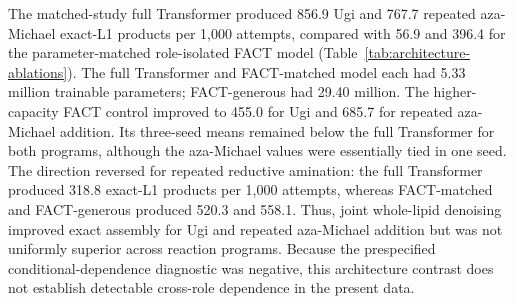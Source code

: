 \documentclass{article}
\theoremstyle{definition}
\newcommand{\ForgeProseMechanismFactGenerousBL}{685.7}
\newcommand{\ForgeProseMechanismFactGenerousLX}{558.1}
\newcommand{\ForgeProseMechanismFactGenerousUgi}{455.0}
\newcommand{\ForgeProseMechanismFactMatchedBL}{396.4}
\newcommand{\ForgeProseMechanismFactMatchedLX}{520.3}
\newcommand{\ForgeProseMechanismFactMatchedUgi}{56.9}
\newcommand{\ForgeProseMechanismFullBL}{767.7}
\newcommand{\ForgeProseMechanismFullLX}{318.8}
\newcommand{\ForgeProseMechanismFullUgi}{856.9}
\newcommand{\ForgeProseMechanismGenerousParameterMillions}{29.40}
\newcommand{\ForgeProseMechanismSharedParameterMillions}{5.33}
\begin{document}
The matched-study full Transformer produced \ForgeProseMechanismFullUgi{} Ugi and
\ForgeProseMechanismFullBL{} repeated aza-Michael exact-L1 products per 1,000 attempts, compared with
\ForgeProseMechanismFactMatchedUgi{} and \ForgeProseMechanismFactMatchedBL{} for the
parameter-matched role-isolated FACT model
(Table~\ref{tab:architecture-ablations}). The full Transformer and FACT-matched model each had
\ForgeProseMechanismSharedParameterMillions{} million trainable parameters; FACT-generous had
\ForgeProseMechanismGenerousParameterMillions{} million. The higher-capacity FACT control improved
to \ForgeProseMechanismFactGenerousUgi{} for Ugi and \ForgeProseMechanismFactGenerousBL{} for
repeated aza-Michael addition. Its three-seed means remained
below the full Transformer for both programs, although the aza-Michael values were essentially tied
in one seed. The direction reversed for repeated reductive amination: the full Transformer produced
\ForgeProseMechanismFullLX{} exact-L1 products per 1,000 attempts, whereas FACT-matched and
FACT-generous produced \ForgeProseMechanismFactMatchedLX{} and
\ForgeProseMechanismFactGenerousLX{}. Thus, joint whole-lipid denoising improved exact assembly
for Ugi and repeated aza-Michael addition but was not uniformly superior across reaction programs.
Because the prespecified conditional-dependence diagnostic was negative, this architecture contrast
does not establish detectable cross-role dependence in the present data.
\end{document}

